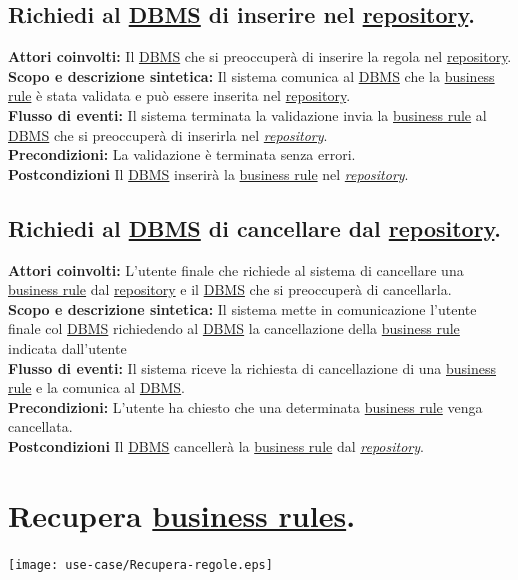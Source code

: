 \subsection{Richiedi al \underline{DBMS}  di inserire nel \underline{repository}.}
\textbf{Attori coinvolti:} Il \underline{DBMS} che si preoccuper\`a di inserire la regola nel \underline{repository}.\\
\textbf{Scopo e descrizione sintetica:} Il sistema comunica al \underline{DBMS} che la \underline{business rule} \`e stata validata e pu\`o essere inserita nel \underline{repository}.\\
\textbf{Flusso di eventi:} Il sistema  terminata la validazione invia la \underline{business rule} al \underline{DBMS} che si preoccuper\`a di inserirla nel \textit{\underline{repository}}.\\
\textbf{Precondizioni:} La validazione \`e terminata senza errori.\\
\textbf{Postcondizioni} Il \underline{DBMS} inserir\`a la \underline{business rule} nel \textit{\underline{repository}}.

\subsection{Richiedi al \underline{DBMS}  di cancellare dal \underline{repository}.}
\textbf{Attori coinvolti:} L'utente finale che richiede al sistema di cancellare una \underline{business rule} dal \underline{repository} e il \underline{DBMS} che si preoccuper\`a di cancellarla.\\
\textbf{Scopo e descrizione sintetica:} Il sistema mette in comunicazione l'utente finale col \underline{DBMS} richiedendo al \underline{DBMS} la cancellazione della \underline{business rule} indicata dall'utente\\
\textbf{Flusso di eventi:} Il sistema riceve la richiesta di cancellazione di una \underline{business rule} e la comunica al \underline{DBMS}.\\
\textbf{Precondizioni:} L'utente ha chiesto che una determinata \underline{business rule} venga cancellata.\\
\textbf{Postcondizioni} Il \underline{DBMS} canceller\`a la \underline{business rule} dal \textit{\underline{repository}}.


\section{Recupera \underline{business rules}.}
\begin{center}
 \texttt{[image: use-case/Recupera-regole.eps]}\
\end{center}

